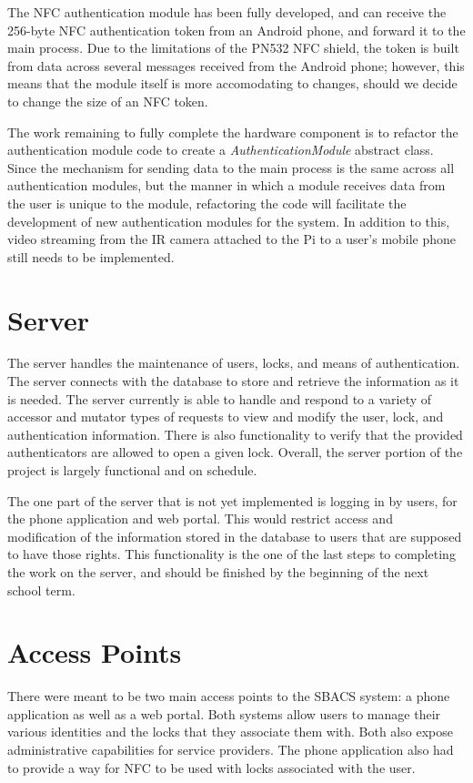 \documentclass{article}
\begin{document}
The NFC authentication module has been fully developed, and can receive the 256-byte NFC authentication token from an 
Android phone, and forward it to the main process. Due to the limitations of the PN532 NFC shield, the token is built 
from data across several messages received from the Android phone; however, this means that the module itself is more 
accomodating to changes, should we decide to change the size of an NFC token.

The work remaining to fully complete the hardware component is to refactor the authentication module code to create a 
\emph{AuthenticationModule} abstract class. Since the mechanism for sending data to the main process is the same across all 
authentication modules, but the manner in which a module receives data from the user is unique to the module, 
refactoring the code will facilitate the development of new authentication modules for the system. In addition to this, 
video streaming from the IR camera attached to the Pi to a user's mobile phone still needs to be implemented.

\section{Server}

The server handles the maintenance of users, locks, and means of authentication. The server connects with the database
to store and retrieve the information as it is needed. The server currently is able to handle and respond to a variety
of accessor and mutator types of requests to view and modify the user, lock, and authentication information. There is
also functionality to verify that the provided authenticators are allowed to open a given lock. Overall, the server
portion of the project is largely functional and on schedule.

The one part of the server that is not yet implemented is logging in by users, for the phone application and web portal.
This would restrict access and modification of the information stored in the database to users that are supposed to have
those rights. This functionality is the one of the last steps to completing the work on the server, and should be finished
by the beginning of the next school term.

\section{Access Points}

There were meant to be two main access points to the SBACS system: a phone application as well as a web portal. Both
systems allow users to manage their various identities and the locks that they associate them with. Both also expose
administrative capabilities for service providers. The phone application also had to provide a way for NFC to be used
with locks associated with the user.
\end{document}
